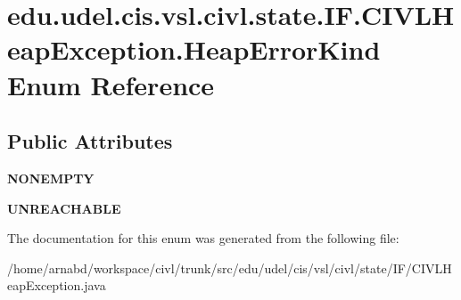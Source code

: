 \hypertarget{enumedu_1_1udel_1_1cis_1_1vsl_1_1civl_1_1state_1_1IF_1_1CIVLHeapException_1_1HeapErrorKind}{}\section{edu.\+udel.\+cis.\+vsl.\+civl.\+state.\+I\+F.\+C\+I\+V\+L\+Heap\+Exception.\+Heap\+Error\+Kind Enum Reference}
\label{enumedu_1_1udel_1_1cis_1_1vsl_1_1civl_1_1state_1_1IF_1_1CIVLHeapException_1_1HeapErrorKind}
\subsection*{Public Attributes}
\begin{DoxyCompactItemize}
\item 
\hypertarget{enumedu_1_1udel_1_1cis_1_1vsl_1_1civl_1_1state_1_1IF_1_1CIVLHeapException_1_1HeapErrorKind_a7888ac4ee70cb5606a55c06f15b9be5f}{}{\bfseries N\+O\+N\+E\+M\+P\+T\+Y}\label{enumedu_1_1udel_1_1cis_1_1vsl_1_1civl_1_1state_1_1IF_1_1CIVLHeapException_1_1HeapErrorKind_a7888ac4ee70cb5606a55c06f15b9be5f}

\item 
\hypertarget{enumedu_1_1udel_1_1cis_1_1vsl_1_1civl_1_1state_1_1IF_1_1CIVLHeapException_1_1HeapErrorKind_ac8a9189b061cc8abbb286a2ded52ea70}{}{\bfseries U\+N\+R\+E\+A\+C\+H\+A\+B\+L\+E}\label{enumedu_1_1udel_1_1cis_1_1vsl_1_1civl_1_1state_1_1IF_1_1CIVLHeapException_1_1HeapErrorKind_ac8a9189b061cc8abbb286a2ded52ea70}

\end{DoxyCompactItemize}


The documentation for this enum was generated from the following file\+:\begin{DoxyCompactItemize}
\item 
/home/arnabd/workspace/civl/trunk/src/edu/udel/cis/vsl/civl/state/\+I\+F/C\+I\+V\+L\+Heap\+Exception.\+java\end{DoxyCompactItemize}
